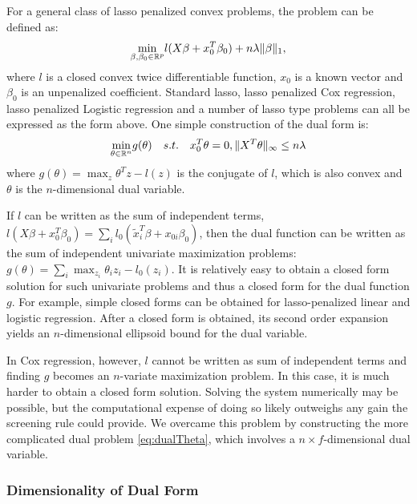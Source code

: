 For a general class of lasso penalized convex problems, the problem can be defined as:
\begin{equation}
    \underset{\beta,\beta_0\in \mathbb{R}^p}{\mathrm{min}}l(X\beta+x_0^T\beta_0)+n\lambda\lVert\beta\rVert_1,
\end{equation}
where $l$ is a closed convex twice differentiable function, $x_0$ is a known vector and $\beta_0$ is an unpenalized coefficient. Standard lasso, lasso penalized Cox regression, lasso penalized Logistic regression and a number of lasso type problems can all be expressed as the form above. One simple construction of the dual form is:
\begin{gather}
    \begin{aligned}
         \underset{\theta\in \mathbb{R}^n}{\mathrm{min}} g(\theta)\quad s.t.\quad x_0^T\theta=0,\lVert X^T\theta\rVert_\infty\leq n\lambda
    \end{aligned}
\end{gather}
where $g(\theta)=\max_z \theta^Tz-l(z)$ is the conjugate of $l$, which is also convex and $\theta$ is the $n$-dimensional dual variable.

If $l$ can be written as the sum of independent terms, $l(X\beta+x_0^T\beta_0)=\sum_i l_0(\tilde{x}_i^T\beta+x_{0i}\beta_0)$, then the dual function can be written as the sum of independent univariate maximization problems: $g(\theta)=\sum_i\max_{z_i} \theta_iz_i-l_0(z_i)$. It is relatively easy to obtain a closed form solution for such univariate problems and thus a closed form for the dual function $g$. For example, simple closed forms can be obtained for lasso-penalized linear and logistic regression. After a closed form is obtained, its second order expansion yields an $n$-dimensional ellipsoid bound for the dual variable.

In Cox regression, however, $l$ cannot be written as sum of independent terms and finding $g$ becomes an $n$-variate maximization problem. In this case, it is much harder to obtain a closed form solution. Solving the system numerically may be possible, but the computational expense of doing so likely outweighs any gain the screening rule could provide. We overcame this problem by constructing the more complicated dual problem \eqref{eq:dualTheta}, which involves a $n\times f$-dimensional dual variable. 

\subsubsection{Dimensionality of Dual Form}

